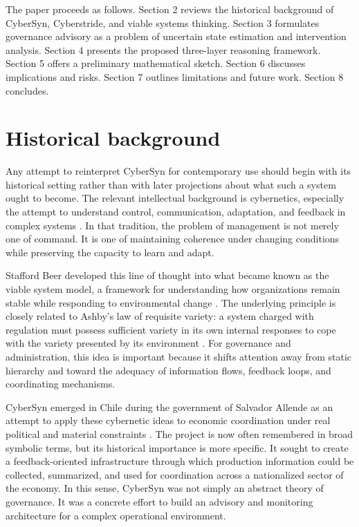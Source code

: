 \documentclass[11pt]{article}
\begin{document}
The paper proceeds as follows. Section 2 reviews the historical background of CyberSyn, Cyberstride, and viable systems thinking. Section 3 formulates governance advisory as a problem of uncertain state estimation and intervention analysis. Section 4 presents the proposed three-layer reasoning framework. Section 5 offers a preliminary mathematical sketch. Section 6 discusses implications and risks. Section 7 outlines limitations and future work. Section 8 concludes.

\section{Historical background}

Any attempt to reinterpret CyberSyn for contemporary use should begin with its historical setting rather than with later projections about what such a system ought to become. The relevant intellectual background is cybernetics, especially the attempt to understand control, communication, adaptation, and feedback in complex systems \citep{ashby1956, beer1956}. In that tradition, the problem of management is not merely one of command. It is one of maintaining coherence under changing conditions while preserving the capacity to learn and adapt.

Stafford Beer developed this line of thought into what became known as the viable system model, a framework for understanding how organizations remain stable while responding to environmental change \citep{beer1972}. The underlying principle is closely related to Ashby's law of requisite variety: a system charged with regulation must possess sufficient variety in its own internal responses to cope with the variety presented by its environment \citep{ashby1956}. For governance and administration, this idea is important because it shifts attention away from static hierarchy and toward the adequacy of information flows, feedback loops, and coordinating mechanisms.

CyberSyn emerged in Chile during the government of Salvador Allende as an attempt to apply these cybernetic ideas to economic coordination under real political and material constraints \citep{medina2014}. The project is now often remembered in broad symbolic terms, but its historical importance is more specific. It sought to create a feedback-oriented infrastructure through which production information could be collected, summarized, and used for coordination across a nationalized sector of the economy. In this sense, CyberSyn was not simply an abstract theory of governance. It was a concrete effort to build an advisory and monitoring architecture for a complex operational environment.
\end{document}
